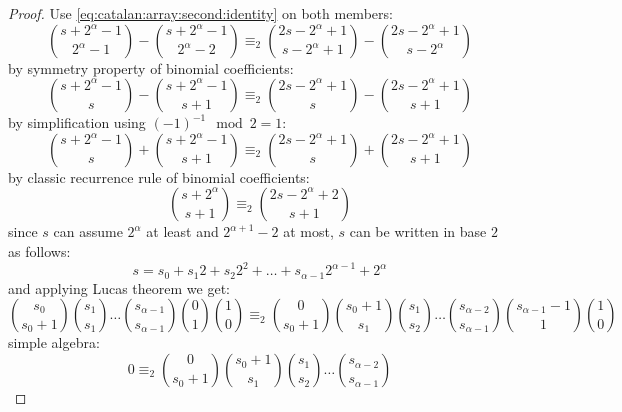 \begin{proof}
    Use \autoref{eq:catalan:array:second:identity} on both members:
    \begin{displaymath}
        {{s+2^{\alpha}-1}\choose{2^{\alpha}-1}}- {{s+2^{\alpha}-1}\choose{2^{\alpha}-2}} \equiv_{2}
        {{2s-2^{\alpha}+1}\choose{s-2^{\alpha}+1}}- {{2s-2^{\alpha}+1}\choose{s-2^{\alpha}}}
    \end{displaymath}
    by symmetry property of binomial coefficients:
    \begin{displaymath}
        {{s+2^{\alpha}-1}\choose{s}}- {{s+2^{\alpha}-1}\choose{s+1}} \equiv_{2}
        {{2s-2^{\alpha}+1}\choose{s}}- {{2s-2^{\alpha}+1}\choose{s+1}}
    \end{displaymath}
    by simplification using $(-1)^{-1}\mod 2=1$: 
    \begin{displaymath}
        {{s+2^{\alpha}-1}\choose{s}}+ {{s+2^{\alpha}-1}\choose{s+1}} \equiv_{2}
        {{2s-2^{\alpha}+1}\choose{s}}+ {{2s-2^{\alpha}+1}\choose{s+1}}
    \end{displaymath}
    by classic recurrence rule of binomial coefficients:
    \begin{displaymath}
        {{s+2^{\alpha}}\choose{s+1}} \equiv_{2} {{2s-2^{\alpha}+2}\choose{s+1}}
    \end{displaymath}
    since $s$ can assume $2^{\alpha}$ at least and $2^{\alpha+1}-2$ at most, 
    $s$ can be written in base $2$ as follows:
    \begin{displaymath}
        s=s_{0} + s_{1}2 + s_{2}2^{2}+\ldots+s_{\alpha-1}2^{\alpha-1}+2^{\alpha}
    \end{displaymath}
    and applying Lucas theorem we get:
    \begin{displaymath}
        {{s_{0}}\choose{s_{0}+1}}
        {{s_{1}}\choose{s_{1}}}
        \ldots
        {{s_{\alpha-1}}\choose{s_{\alpha-1}}}
        {{0}\choose{1}}
        {{1}\choose{0}}
        \equiv_{2}
        {{0}\choose{s_{0}+1}}
        {{s_{0}+1}\choose{s_{1}}}
        {{s_{1}}\choose{s_{2}}}
        \ldots
        {{s_{\alpha-2}}\choose{s_{\alpha-1}}}
        {{s_{\alpha-1}-1}\choose{1}}
        {{1}\choose{0}}
    \end{displaymath}
    simple algebra:
    \begin{displaymath}
        0
        \equiv_{2}
        {{0}\choose{s_{0}+1}}
        {{s_{0}+1}\choose{s_{1}}}
        {{s_{1}}\choose{s_{2}}}
        \ldots
        {{s_{\alpha-2}}\choose{s_{\alpha-1}}}

\end{displaymath}
\end{proof}
